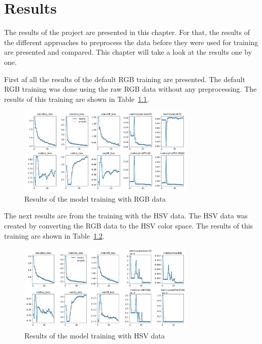 \chapter{Results}
\label{ch:results}


The results of the project are presented in this chapter. For that, the results of the different approaches to preprocess the data before they were used for training are presented and compared. This chapter will take a look at the results one by one.

First af all the results of the default RGB training are presented. The default RGB training was done using the raw RGB data without any preprocessing. The results of this training are shown in Table~\ref{fig:results_rgb}.

\begin{figure}[htbp] 
    \centering
    \includegraphics[width=0.75\textwidth]{images/results/rgb_results.png}
    \caption{Results of the model training with RGB data}
    \label{fig:results_rgb}
\end{figure}


The next results are from the training with the HSV data. The HSV data was created by converting the RGB data to the HSV color space. The results of this training are shown in Table~\ref{fig:results_hsv}.

\begin{figure}[htbp] 
    \centering
    \includegraphics[width=0.75\textwidth]{images/results/hsv_results.png}
    \caption{Results of the model training with HSV data}
    \label{fig:results_hsv}
\end{figure}

